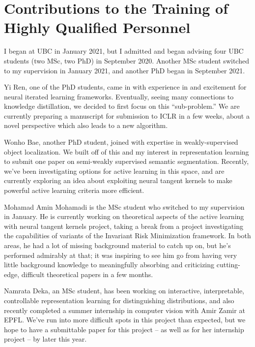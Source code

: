 \documentclass[12pt]{article}
\begin{document}
{%

{%
\printbibliography[category=sec{{ loop.index }},title={ {{- sec_name -}} },heading=subbibnumbered]{}
{%

{%

\section{Contributions to the Training of Highly Qualified Personnel}

I began at UBC in January 2021, but I admitted and began advising four UBC students (two MSc, two PhD) in September 2020. Another MSc student switched to my supervision in January 2021, and another PhD began in September 2021.

Yi Ren, one of the PhD students, came in with experience in and excitement for neural iterated learning frameworks. Eventually, seeing many connections to knowledge distillation, we decided to first focus on this ``sub-problem.'' We are currently preparing a manuscript for submission to ICLR in a few weeks, about a novel perspective which also leads to a new algorithm.

Wonho Bae, another PhD student, joined with expertise in weakly-supervised object localization. We built off of this and my interest in representation learning to submit one paper on semi-weakly supervised semantic segmentation. Recently, we've been investigating options for active learning in this space, and are currently exploring an idea about exploiting neural tangent kernels to make powerful active learning criteria more efficient.

Mohamad Amin Mohamadi is the MSc student who switched to my supervision in January. He is currently working on theoretical aspects of the active learning with neural tangent kernels project, taking a break from a project investigating the capabilities of variants of the Invariant Risk Minimization framework. In both areas, he had a lot of missing background material to catch up on, but he's performed admirably at that; it was inspiring to see him go from having very little background knowledge to meaningfully absorbing and criticizing cutting-edge, difficult theoretical papers in a few months.

Namrata Deka, an MSc student, has been working on interactive, interpretable, controllable representation learning for distinguishing distributions, and also recently completed a summer internship in computer vision with Amir Zamir at EPFL. We've run into more difficult spots in this project than expected, but we hope to have a submittable paper for this project -- as well as for her internship project -- by later this year.

}}}}
\end{document}

